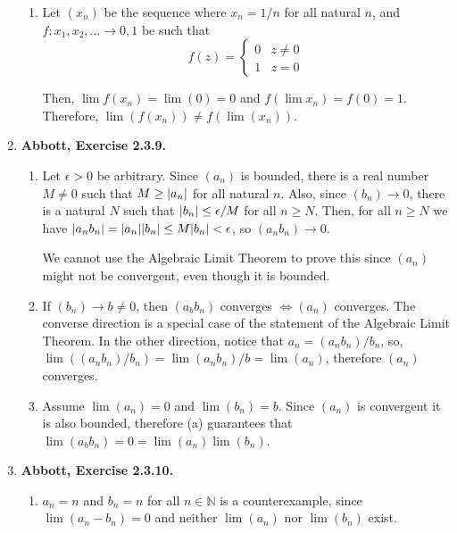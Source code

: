 \documentclass{article}
\DeclarePairedDelimiter\abs{\lvert}{\rvert}
\newcommand{\N}{\mathbb{N}}
\newcommand{\exc}[2][Abbott]{\item \textbf{#1, Exercise #2.}}
\begin{document}
\begin{enumerate}
\begin{enumerate}
		\item Let $(x_n)$ be the sequence where $x_n = 1/n$ for all natural $n$, and $f : {x_1, x_2, \dots} \rightarrow {0, 1}$ be such that \begin{equation*}
		      f(z) = \begin{cases}
		      0 & z \neq 0 \\
		      1 & z = 0
		\end{cases}
		\end{equation*}
						            
		Then, $\lim f(x_n) = \lim (0) = 0$ and $f(\lim x_n) = f(0) = 1$. Therefore, $\lim (f(x_n)) \neq f(\lim(x_n))$.
	\end{enumerate}
			        
	\exc{2.3.9}
	\begin{enumerate}
		\item Let $\epsilon > 0$ be arbitrary. Since $(a_n)$ is bounded, there is a real number $M \neq 0$ such that $M \geq \abs{a_n}$ for all natural $n$. Also, since $(b_n) \rightarrow 0$, there is a natural $N$ such that $\abs{b_n} \leq \epsilon/M$ for all $n \geq N$. Then, for all $n \geq N$ we have $\abs{a_n b_n} = \abs{a_n} \abs{b_n} \leq M \abs{b_n} < \epsilon$, so $(a_n b_n) \rightarrow 0$.
		      		      		      	        
		      We cannot use the Algebraic Limit Theorem to prove this since $(a_n)$ might not be convergent, even though it is bounded.
		      		      		      	        
		\item If $(b_n) \rightarrow b \neq 0$, then $(a_b b_n)$ converges $\iff (a_n)$ converges. The converse direction is a special case of the statement of the Algebraic Limit Theorem. In the other direction, notice that $a_n = (a_n b_n) / b_n$, so, $\lim ((a_n b_n) / b_n) = \lim(a_n b_n) / b = \lim (a_n)$, therefore $(a_n)$ converges.
		      		      		      	        
		\item Assume $\lim (a_n) = 0$ and $\lim (b_n) = b$. Since $(a_n)$ is convergent it is also bounded, therefore (a) guarantees that $\lim(a_b b_n) = 0 = \lim(a_n) \lim(b_n)$.
	\end{enumerate}
				    
	\exc{2.3.10}
	\begin{enumerate}
		\item $a_n = n$ and $b_n = n$ for all $n \in \N$ is a counterexample, since $\lim (a_n - b_n) = 0$ and neither $\lim(a_n)$ nor $\lim(b_n)$ exist.
		      		      		      	     

\end{enumerate}
\end{enumerate}
\end{document}
